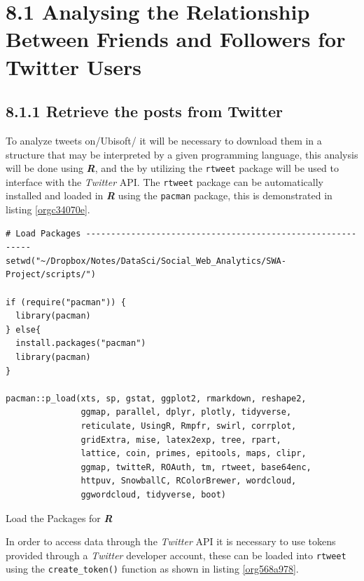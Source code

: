 \documentclass[11pt]{article}
\begin{document}
\section{8.1 Analysing the Relationship Between Friends and Followers for Twitter Users}
\label{sec:org7394602}
\subsection{8.1.1 Retrieve the posts from Twitter}
\label{sec:org4edce69}
To analyze tweets on/Ubisoft/ it will be necessary to
download them in a structure that may be interpreted by a given programming
language, this analysis will be done using \textbf{\emph{R}}, and the by utilizing the \texttt{rtweet} package will be used to interface with the \emph{Twitter} API. The \texttt{rtweet} package can be automatically installed and loaded in \textbf{\emph{R}} using the \texttt{pacman} package, this is demonstrated in listing \ref{orgc34070e}.

\begin{listing}[htbp]
\begin{verbatim}
# Load Packages -----------------------------------------------------------
setwd("~/Dropbox/Notes/DataSci/Social_Web_Analytics/SWA-Project/scripts/")

if (require("pacman")) {
  library(pacman)
} else{
  install.packages("pacman")
  library(pacman)
}

pacman::p_load(xts, sp, gstat, ggplot2, rmarkdown, reshape2,
               ggmap, parallel, dplyr, plotly, tidyverse,
               reticulate, UsingR, Rmpfr, swirl, corrplot,
               gridExtra, mise, latex2exp, tree, rpart,
               lattice, coin, primes, epitools, maps, clipr,
               ggmap, twitteR, ROAuth, tm, rtweet, base64enc,
               httpuv, SnowballC, RColorBrewer, wordcloud,
               ggwordcloud, tidyverse, boot)
\end{verbatim}
\caption{\label{orgc34070e}Load the Packages for \textbf{\textbf{\emph{R}}}}
\end{listing}


In order to access data through the \emph{Twitter} API it is necessary to use tokens provided through a \emph{Twitter} developer account, these can be loaded into \texttt{rtweet} using the \texttt{create\_token()} function as shown in listing \ref{org568a978}.
\end{document}
